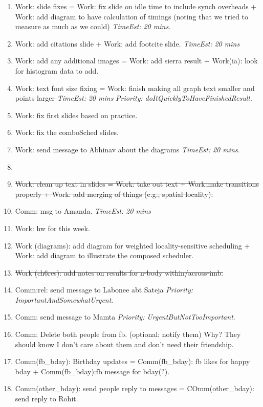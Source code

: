 \documentclass[11pt]{article}
\newcommand{\doneTask}[1]{\item \sout{\small #1}}
\newcommand{\te}[1]{\textit{TimeEst:} \textit{#1}}
\newcommand{\priority}[1]{\textit{Priority:} \textit{#1}}
\newcommand{\prio}[1]{\textit{Priority:} \textit{#1}}
\begin{document}
\begin{enumerate}
\item Work: slide fixes  = Work: fix slide on idle time to include
  synch overheads + Work: add diagram to have calculation of timings
  (noting that we tried to measure as much as we could) \te{20
    mins}. \item Work: add citations slide  + Work: add footcite
  slide. \te{20 mins} 

\item Work: add any additional images =  Work: add sierra result  +
  Work(ia): look for histogram data to add. 

\item Work: text font size fixing = Work: finish making all graph text
  smaller and points larger  \te{20 mins}
  \prio{doItQuicklyToHaveFinishedResult}. 

\item Work: fix first slides based on practice. 
\item Work: fix the comboSched slides. 

\item Work: send message to Abhinav about the diagrams \te{20 mins}. 

\item \doneTask{Work: clean up text in slides  = Work: take out text +
  Work:make transitions properly + Work: add merging of things (e.g.,
  spatial locality).}

\item Comm: msg to Amanda. \te{20 mins}
\item Work: hw for this week.

\item Work (diagrams): add diagram for weighted locality-sensitive
  scheduling + Work: add diagram to illustrate the composed
  scheduler. 

\doneTask{ Work (ch6res): add notes on results for n-body within/across-imb.}

\item Comm:rel: send message to Labonee abt Sateja \priority{ImportantAndSomewhatUrgent}. 

\item Comm: send message to Mamta
  \priority{UrgentButNotTooImportant}. 

\item Comm: Delete both people from fb. (optional: notify them) Why?
  They should know I don't care about them and don't need their
  friendship. 

\item Comm(fb\_bday): Birthday updates = Comm(fb\_bday): fb likes for happy bday  + Comm(fb\_bday):fb message for bday(?). 
\item Comm(other\_bday): send people reply to messages = COmm(other\_bday): send reply to Rohit. 
\end{enumerate}
 
\end{document}

